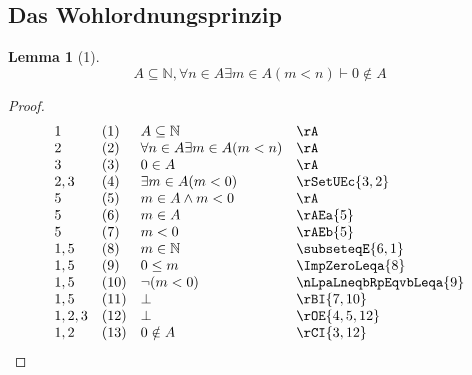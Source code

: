 \documentclass{book}
\theoremstyle{plain}
\newtheorem*{lemma}{Lemma} %
\theoremstyle{remark}
\theoremstyle{definition}
\begin{document}
\subsection{Das Wohlordnungsprinzip}
\begin{lemma}[1]
\[A\subseteq\mathbb{N},\forall n\in A\exists m\in A(m<n)\vdash 0\notin A\]
\end{lemma}
\begin{proof}
	\[
	\begin{array}{llll}
        1  & (1) & A\subseteq\mathbb{N} & \rA \\
	2  & (2) & \forall n\in A\exists m\in A(m<n) & \rA \\
        3  & (3) & 0\in A & \rA \\
        2,3& (4) & \exists m\in A(m<0) & \rSetUEc{3,2} \\
        5  & (5) & m\in A\land m<0 & \rA \\
        5  & (6) & m\in A          & \rAEa{5} \\
        5  & (7) & m<0             & \rAEb{5} \\
        1,5& (8) & m\in\mathbb{N}  & \subseteqE{6,1} \\
        1,5& (9) & 0\leq m & \ImpZeroLeqa{8} \\
        1,5& (10) & \neg(m<0) & \nLpaLneqbRpEqvbLeqa{9} \\
        1,5& (11) & \bot & \rBI{7,10} \\
        1,2,3& (12) & \bot & \rOE{4,5,12} \\
        1,2& (13) & 0\notin A & \rCI{3,12} \\
	\end{array}
	\]
\end{proof}
\end{document}
